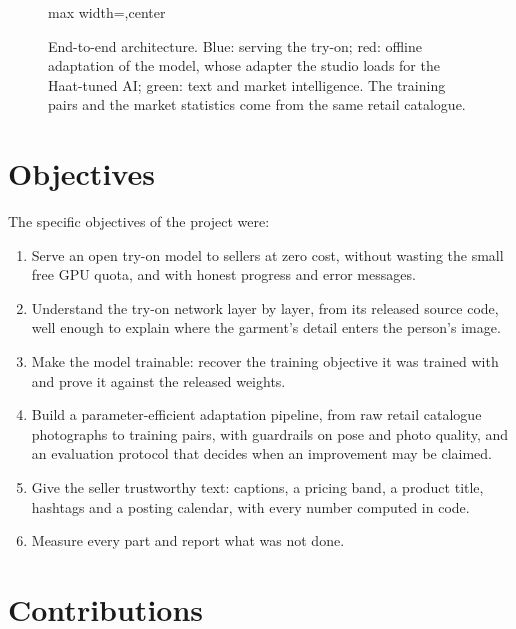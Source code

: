 \begin{figure}[!htbp]
\begin{adjustbox}{max width=\linewidth,center}
\end{adjustbox}
\caption{End-to-end architecture. Blue: serving the try-on; red: offline adaptation of the model, whose adapter the studio loads for the Haat-tuned AI; green: text and market intelligence. The training pairs and the market statistics come from the same retail catalogue.}
\label{fig:arch}
\end{figure}

\section{Objectives}

The specific objectives of the project were:

\begin{enumerate}
\item Serve an open try-on model to sellers at zero cost, without wasting the small free GPU quota, and with honest progress and error messages.
\item Understand the try-on network layer by layer, from its released source code, well enough to explain where the garment's detail enters the person's image.
\item Make the model trainable: recover the training objective it was trained with and prove it against the released weights.
\item Build a parameter-efficient adaptation pipeline, from raw retail catalogue photographs to training pairs, with guardrails on pose and photo quality, and an evaluation protocol that decides when an improvement may be claimed.
\item Give the seller trustworthy text: captions, a pricing band, a product title, hashtags and a posting calendar, with every number computed in code.
\item Measure every part and report what was not done.
\end{enumerate}

\section{Contributions}

